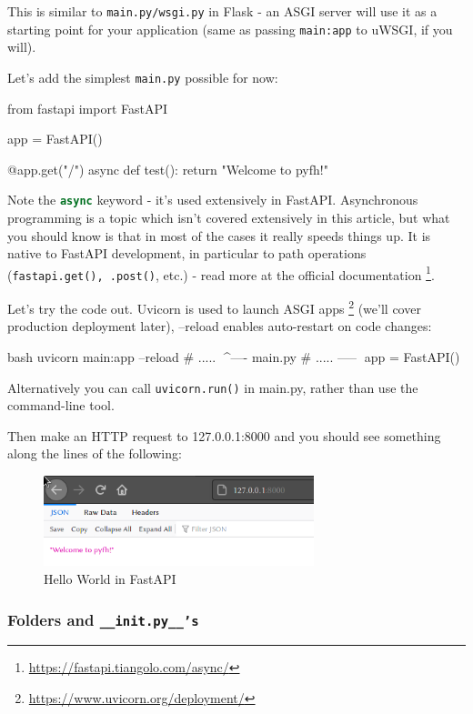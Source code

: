 \documentclass[14pt]{extarticle}
\newcommand{\flink}[1]{\footnote{\href{#1}{#1}}}
\newcommand{\pyinline}[1]{\lstinline[language=Python, style=cstyle, morekeywords={async}, basicstyle=\ttfamily\normalsize]{#1}}
\begin{document}
This is similar to \texttt{main.py/wsgi.py} in Flask - an ASGI server will use it as a starting point for your application (same as passing \texttt{main:app} to uWSGI, if you will).

Let's add the simplest \texttt{main.py} possible for now:

\begin{pycode}
    from fastapi import FastAPI

    app = FastAPI()

    @app.get("/")
    async def test():
    return "Welcome to pyfh!"
\end{pycode}

Note the \pyinline{async} keyword - it's used extensively in FastAPI. Asynchronous programming is a topic which isn't covered extensively in this article, but what you should know is that in most of the cases it really speeds things up. It is native to FastAPI development, in particular to path operations (\pyinline{fastapi.get(), .post()}, etc.) - read more at the official documentation \flink{https://fastapi.tiangolo.com/async/}.

Let's try the code out. Uvicorn is used to launch ASGI apps \flink{https://www.uvicorn.org/deployment/} (we'll cover production deployment later), --reload enables auto-restart on code changes:

\begin{code}{bash}
    uvicorn main:app --reload
    # ..... ^^^^---- main.py
    # ..... -----^^^ app = FastAPI()
\end{code}

Alternatively you can call \texttt{uvicorn.run()} in main.py, rather than use the command-line tool.

Then make an HTTP request to 127.0.0.1:8000 and you should see something along the lines of the following:

\begin{figure}[h]
    \centering
    \includegraphics[width=0.7\textwidth]{img/helloworld.png}
    \caption{Hello World in FastAPI}
\end{figure}

\subsubsection{Folders and \texttt{\_\_init.py\_\_'s}}
\end{document}
